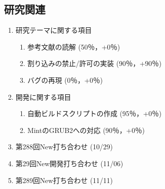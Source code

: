 \documentclass[fleqn, 14pt]{extarticle}
\begin{document}
    \subsection{研究関連}
    \label{sec-2-1}
    \begin{enumerate}

        \item 研究テーマに関する項目
            \hfill
            \label{enum-research1}
            \begin{enumerate}

                \item 参考文献の読解
                    \hfill
                    \label{enum-1-A}
                    (50％，+0％)

                \item 割り込みの禁止/許可の実装
                    \hfill
                    \label{enum-1-B}
                    (90％，+90％)

                \item バグの再現
                    \hfill
                    \label{enum-1-C}
                    (0％，+0％)

            \end{enumerate}

        \item 開発に関する項目
            \hfill
            \label{enum-research2}
            \begin{enumerate}

                \item 自動ビルドスクリプトの作成
                    \hfill
                    \label{enum-2-A}
                    (95％，+0％)

                \item MintのGRUB2への対応
                    \hfill
                    \label{enum-2-B}
                    (90％，+0％)

            \end{enumerate}

        \item 第288回New打ち合わせ
            \hfill
            \label{enum-research3}
            (10/29)

        \item 第29回New開発打ち合わせ 
            \hfill
            \label{enum-research3}
            (11/06)

        \item 第289回New打ち合わせ
            \hfill
            \label{enum-research3}
            (11/11)

    \end{enumerate}
\end{document}
